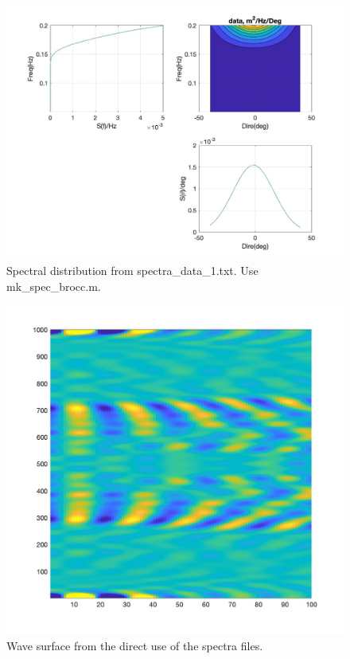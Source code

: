 \documentclass[preprint,10pt]{elsarticle}
\begin{document}
 \begin{figure}
\begin{center}
 \includegraphics[width=1.0\textwidth]{figures/spectral.jpg}
 \caption{Spectral distribution from spectra\_data\_1.txt.  Use mk\_spec\_brocc.m. }
 \label{spec}
 \end{center}
 \end{figure}
  
  \begin{figure}
\begin{center}
 \includegraphics[width=1.0\textwidth]{figures/tmp.jpg}
 \caption{Wave surface from the direct use of the spectra files.}
 \label{tmp}
 \end{center}
 \end{figure}
    
\end{document}
